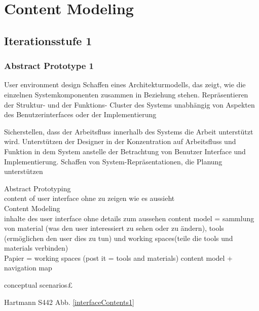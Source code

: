 
\section{Content Modeling}

\subsection{Iterationsstufe 1}
\subsubsection{Abstract Prototype 1}

User environment design Schaffen eines Architekturmodells, das zeigt, wie die einzelnen Systemkomponenten zusammen in Beziehung stehen. Repräsentieren der Struktur- und der Funktions- Cluster des Systems unabhängig von Aspekten des Benutzerinterfaces 
oder der Implementierung

Sicherstellen, dass der Arbeitsfluss innerhalb des Systems die Arbeit unterstützt wird. Unterstützen der Designer in der Konzentration auf Arbeitsfluss und Funktion in dem System anstelle der Betrachtung von Benutzer Interface und Implementierung. Schaffen von System-Repräsentationen, die Planung unterstützen

 Abstract Prototyping\\
 content of user interface ohne zu zeigen wie es aussieht\\

 Content Modeling \\
 inhalte des user interface ohne details zum aussehen
 content model = sammlung von material (was den user interessiert zu sehen oder zu ändern), tools (ermöglichen den user dies zu tun) und working spaces(teile die tools und materials verbinden)\\

 Papier = working spaces (post it = tools and materials)
 content model + navigation map

 conceptual scenarios£


Hartmann S442
Abb. \ref{interfaceContents1}

